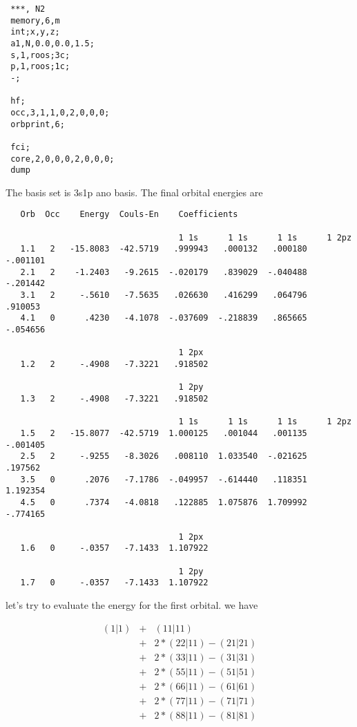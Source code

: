 \documentclass[a4paper,11pt]{report}
\begin{document}
\begin{verbatim}
 ***, N2
 memory,6,m
 int;x,y,z;
 a1,N,0.0,0.0,1.5;
 s,1,roos;3c;
 p,1,roos;1c;
 -;

 hf;
 occ,3,1,1,0,2,0,0,0;
 orbprint,6;

 fci;
 core,2,0,0,0,2,0,0,0;
 dump
\end{verbatim}

The basis set is 3s1p ano basis. The final orbital energies are

\begin{verbatim}
   Orb  Occ    Energy  Couls-En    Coefficients
   
                                   1 1s      1 1s      1 1s      1 2pz
   1.1   2   -15.8083  -42.5719   .999943   .000132   .000180  -.001101
   2.1   2    -1.2403   -9.2615  -.020179   .839029  -.040488  -.201442
   3.1   2     -.5610   -7.5635   .026630   .416299   .064796   .910053
   4.1   0      .4230   -4.1078  -.037609  -.218839   .865665  -.054656
   
                                   1 2px
   1.2   2     -.4908   -7.3221   .918502
   
                                   1 2py
   1.3   2     -.4908   -7.3221   .918502
   
                                   1 1s      1 1s      1 1s      1 2pz
   1.5   2   -15.8077  -42.5719  1.000125   .001044   .001135  -.001405
   2.5   2     -.9255   -8.3026   .008110  1.033540  -.021625   .197562
   3.5   0      .2076   -7.1786  -.049957  -.614440   .118351  1.192354
   4.5   0      .7374   -4.0818   .122885  1.075876  1.709992  -.774165

                                   1 2px
   1.6   0     -.0357   -7.1433  1.107922

                                   1 2py
   1.7   0     -.0357   -7.1433  1.107922
\end{verbatim}
 

let's try to evaluate the energy for the first orbital. we have

\begin{eqnarray}
(1|1)&+&(11|11) \\
  &+&2*(22|11)-(21|21) \\
  &+&2*(33|11)-(31|31) \\
  &+&2*(55|11)-(51|51) \\
  &+&2*(66|11)-(61|61) \\
  &+&2*(77|11)-(71|71) \\
  &+&2*(88|11)-(81|81)
\end{eqnarray}
\end{document}
